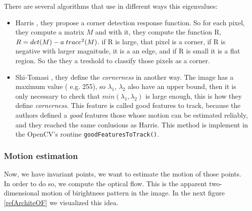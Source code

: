 \documentclass[12pt, a4paper, titlepage,twoside,openright]{article}
\begin{document}
There are several algorithms that use in different ways this eigenvalues:

\begin{itemize}

\item Harris \cite{harris}, they propose a corner detection response function. So for each pixel, they compute a matrix $M$ and with it, they compute the function
R, $R = det(M)-a \hspace{0.1cm} trace^{2}(M)$. if R is large, that pixel is a corner, if R is negative with larger magnitude, it is a an edge, and if R is small it is a 
flat region. So the they a treshold to classify those pixels as a corner. 

\item Shi-Tomasi \cite{shi}, they define the \textit{cornerness} in another way. The image has a maximum value ( e.g. 255), so $\lambda_{1}$, $\lambda_{2}$ also have an upper bound, then it is only necessary to check that $min(\lambda_{1},\lambda_{2})$ is large enough, this is how they define \textit{cornerness}. This feature is called good features to track, because the authors defined a \textit{good} features those whose motion can be estimated reliably, and they reached the same conlusions as Harris. This method is implement in the OpenCV's routine \texttt{goodFeaturesToTrack()}.

\end{itemize}

\subsubsection{Motion estimation}

Now, we have invariant points, we want to estimate the motion of those points. In order to do so, we compute the optical flow. This is the apparent two-dimensional motion of birightness pattern in the image. In the next figure \ref{refArchiteOF} we visualized this idea.
\end{document}
